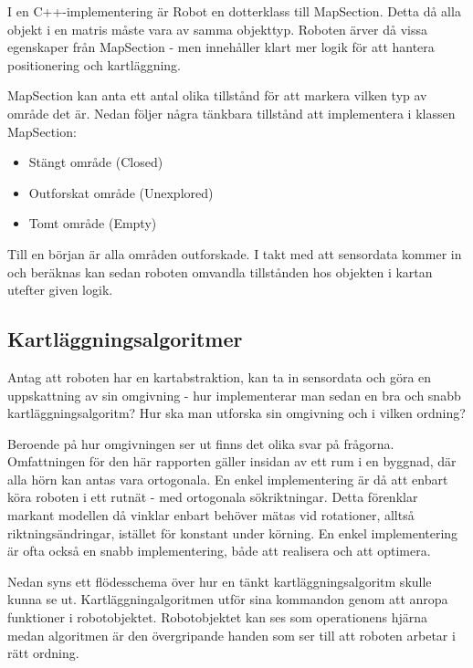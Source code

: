 \documentclass[a4paper,12pt,fleqn]{article}
\begin{document}
I en C++-implementering är Robot en dotterklass till MapSection. Detta då alla objekt i en matris måste vara av samma objekttyp. Roboten ärver då vissa egenskaper från MapSection - men innehåller klart mer logik för att hantera positionering och kartläggning. 

MapSection kan anta ett antal olika tillstånd för att markera vilken typ av område det är. Nedan följer några tänkbara tillstånd att implementera i klassen MapSection: 

\begin{itemize}
	\item Stängt område (Closed)
	\item Outforskat område (Unexplored)
	\item Tomt område (Empty)
\end{itemize}

Till en början är alla områden outforskade. I takt med att sensordata kommer in och beräknas kan sedan roboten omvandla tillstånden hos objekten i kartan utefter given logik. 


\newpage
\subsection{Kartläggningsalgoritmer}

Antag att roboten har en kartabstraktion, kan ta in sensordata och göra en uppskattning av sin omgivning - hur implementerar man sedan en bra och snabb kartläggningsalgoritm? Hur ska man utforska sin omgivning och i vilken ordning? 

Beroende på hur omgivningen ser ut finns det olika svar på frågorna. Omfattningen för den här rapporten gäller insidan av ett rum i en byggnad, där alla hörn kan antas vara ortogonala. En enkel implementering är då att enbart köra roboten i ett rutnät - med ortogonala sökriktningar. Detta förenklar markant modellen då vinklar enbart behöver mätas vid rotationer, alltså riktningsändringar, istället för konstant under körning. En enkel implementering är ofta också en snabb implementering, både att realisera och att optimera. 

Nedan syns ett flödesschema över hur en tänkt kartläggningsalgoritm skulle kunna se ut. Kartläggningalgoritmen utför sina kommandon genom att anropa funktioner i robotobjektet. Robotobjektet kan ses som operationens hjärna medan algoritmen är den övergripande handen som ser till att roboten arbetar i rätt ordning. 
\end{document}
